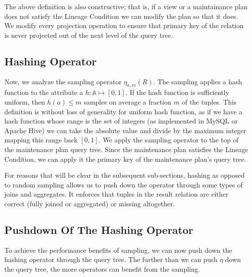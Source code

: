 The above definition is also constructive; that is, if a view or a maintainance plan does not satisfy the Lineage Condition we can modify the plan so that it does.
We modify every projection operation to ensure that primary key of the relation is never projected out of the next level of the query tree.

\subsection{Hashing Operator}
Now, we analyze the sampling operator $\eta_{a, m}(R)$. 
The sampling applies a hash function to the attribute a $h:\mathbb{A} \mapsto [0,1]$.
If the hash function is sufficiently uniform, then $h(a) \le m$ samples on average a fraction $m$ of the tuples.
This definition is without loss of generality for uniform hash function, as if we have a hash function whose range is the set of integers (as implemented in MySQL or Apache Hive) we can take the absolute value and divide by the maximum integer mapping this range back $[0,1]$.
We apply the sampling operator to the top of the maintenance plan query tree.
Since the maintenance plan satisfies the Lineage Condition, we can apply it the primary key of the maintenance plan's query tree.

For reasons that will be clear in the subsequent sub-sections, hashing as opposed to random sampling allows us to push down the operator through some types of joins and aggregates. 
It enforces that tuples in the result relation are either correct (fully joined or aggregated) or missing altogether.

\subsection{Pushdown Of The Hashing Operator}
To achieve the performance benefits of sampling, we can now push down the hashing operator through the query tree.
The further than we can push $\eta$ down the query tree, the more operators can benefit from the sampling.

